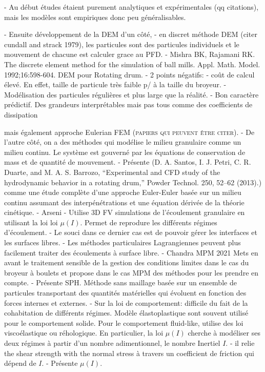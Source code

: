 - Au début études étaient purement analytiques et expérimentales (qq citations), mais les modèles sont empiriques donc peu généralisables.

- Ensuite développement de la DEM d'un côté,
- en discret méthode DEM (citer cundall and strack 1979), les particules sont des particules individuels et le mouvement de chacune est calculer grace au PFD.
- Mishra BK, Rajamani RK. The discrete element method for the simulation of ball mills. Appl. Math. Model. 1992;16:598-604. DEM pour Rotating drum.
- 2 points négatifs:
- coût de calcul élevé. En effet, taille de particule très faible p/ à la taille du broyeur.
- Modélisation des particules régulières et plus large que la réalité.
- Bon caractère prédictif. Des grandeurs interprétables mais pas tous comme des coefficients de dissipation


mais également approche Eulerian FEM (\textsc{papiers qui peuvent être citer}).
- De l'autre côté, on a des méthodes qui modélise le milieu granulaire comme un milieu continu. Le système est gouverné par les équations de conservation de mass et de quantité de mouvement.
- Présente (D. A. Santos, I. J. Petri, C. R. Duarte, and M. A. S. Barrozo, “Experimental and CFD study of the hydrodynamic behavior in a rotating drum,” Powder Technol. 250, 52–62 (2013).) comme une étude complète d'une approche Euler-Euler basée sur un milieu continu assumant des interpénétrations et une équation dérivée de la théorie cinétique.
- Arseni - Utilise 3D FV simulations de l'écoulement granulaire en utilisant la loi loi $\mu(I)$. Permet de reprodure les différents régimes d'écoulement.
- Le souci dans ce dernier cas est de pouvoir gérer les interfaces et les surfaces libres.
- Les méthodes particulaires Lagrangiennes peuvent plus facilement traiter des écoulements à surface libre.
- Chandra MPM 2021 Mets en avant le traitement sensible de la gestion des conditions limites dans le cas du broyeur à boulets et propose dans le cas MPM des méthodes pour les prendre en compte.
- Présente SPH. Méthode sans maillage basée sur un ensemble de particules transportant des quantités matérielles qui évoluent en fonction des forces internes et externes.
- Sur la loi de comportement: difficile du fait de la cohabitation de différents régimes. Modèle élastoplastique sont souvent utilisé pour le comportement solide. Pour le comportement fluid-like, utilise des loi viscoélastique ou réhologique. En particulier, la loi $\mu (I)$ cherche à modéliser ses deux régimes à partir d'un nombre adimentionnel, le nombre Inertiel $I$.
- il relie the shear strength with the normal stress à travers un coefficient de friction qui dépend de $I$.
- Présente $\mu(I)$.

